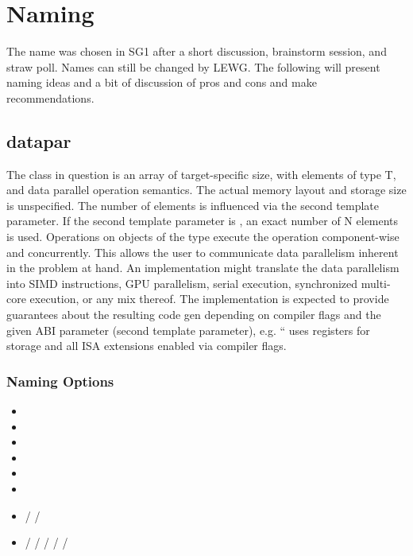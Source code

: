 \section{Naming}\label{sec:Naming}

The name \datapar was chosen in SG1 after a short discussion, brainstorm session, and straw poll.
Names can still be changed by LEWG.
The following will present naming ideas and a bit of discussion of pros and cons and make
recommendations.

\subsection{datapar}

The class in question is an array of target-specific size, with elements of type T, and data parallel operation semantics.
The actual memory layout and storage size is unspecified.
The number of elements is influenced via the second template parameter.
If the second template parameter is , an exact number of N elements is used.
Operations on objects of the type execute the operation component-wise and concurrently.
This allows the user to communicate data parallelism inherent in the problem at hand.
An implementation might translate the data parallelism into SIMD instructions, GPU parallelism, serial execution, synchronized multi-core execution, or any mix thereof.
The implementation is expected to provide guarantees about the resulting code gen depending on compiler flags and the given ABI parameter (second template parameter), e.g. “ uses  registers for storage and all ISA extensions enabled via compiler flags.

\subsubsection{Naming Options}

\begin{itemize}
  \item {}
  \item {}
  \item {}
  \item {}
  \item {}
  \item {}
  \item {} /  / 
  \item {} /  /  /  /  / 
\end{itemize}

